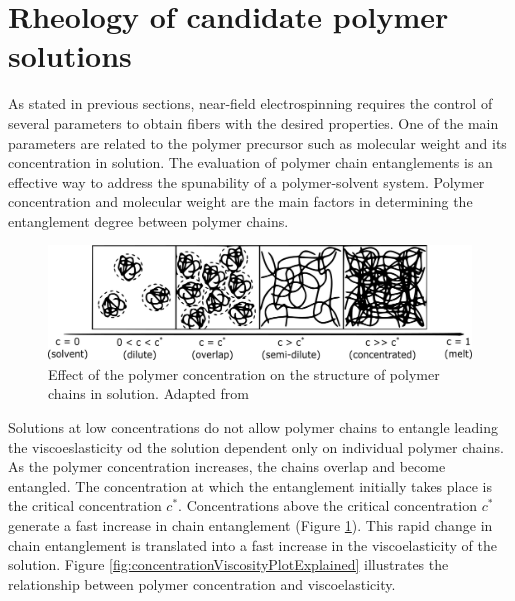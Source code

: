 \section{Rheology of candidate polymer solutions}
As stated in previous sections, near-field electrospinning requires the control of several parameters to obtain fibers with the desired properties. One of the main parameters are related to the polymer precursor such as molecular weight and its concentration in solution. The evaluation of polymer chain entanglements is an effective way to address the spunability of a polymer-solvent system. \cite{Shenoy2005} Polymer concentration and molecular weight are the main factors in determining the entanglement degree between polymer chains. 

\begin{figure}[!th]
\centering
\includegraphics[scale=0.50]{./Figures/criticalConcentrationEntanglement.png}
\decoRule
\caption[Polymer Chain Entanglement in Function of Polymer Concentration]{Effect of the polymer concentration on the structure of polymer chains in solution. Adapted from \cite{Burghelea2020}}
\label{fig:criticalConcentrationEntanglement}
\end{figure}

Solutions at low concentrations do not allow polymer chains to entangle leading the viscoeslasticity od the solution dependent only on individual polymer chains. As the polymer concentration increases, the chains overlap and become entangled. The concentration at which the entanglement initially takes place is the critical concentration $c^*$. Concentrations above the critical concentration $c^*$ generate a fast increase in chain entanglement (Figure \ref{fig:criticalConcentrationEntanglement}). This rapid change in chain entanglement is translated into a fast increase in the viscoelasticity of the solution. Figure \ref{fig:concentrationViscosityPlotExplained} illustrates the relationship between polymer concentration and viscoelasticity. \cite{Burghelea2020, Gupta2005}

